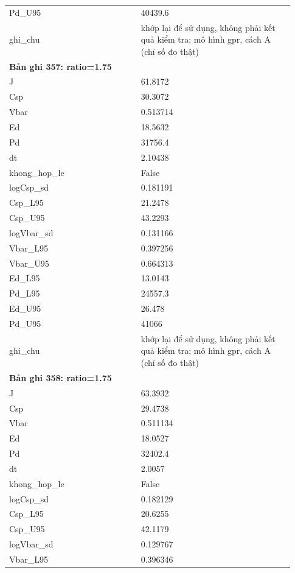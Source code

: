 \begin{longtable}{p{0.43\linewidth}p{0.50\linewidth}}
Pd\_\allowbreak U95 & 40439.6 \\
ghi\_\allowbreak chu & khớp lại để sử dụng, không phải kết quả kiểm tra; mô hình gpr, cách A (chỉ số đo thật) \\
\midrule
\multicolumn{2}{p{0.95\linewidth}}{\textbf{Bản ghi 357: ratio=1.75}} \\
J & 61.8172 \\
Csp & 30.3072 \\
Vbar & 0.513714 \\
Ed & 18.5632 \\
Pd & 31756.4 \\
dt & 2.10438 \\
khong\_\allowbreak hop\_\allowbreak le & False \\
logCsp\_\allowbreak sd & 0.181191 \\
Csp\_\allowbreak L95 & 21.2478 \\
Csp\_\allowbreak U95 & 43.2293 \\
logVbar\_\allowbreak sd & 0.131166 \\
Vbar\_\allowbreak L95 & 0.397256 \\
Vbar\_\allowbreak U95 & 0.664313 \\
Ed\_\allowbreak L95 & 13.0143 \\
Pd\_\allowbreak L95 & 24557.3 \\
Ed\_\allowbreak U95 & 26.478 \\
Pd\_\allowbreak U95 & 41066 \\
ghi\_\allowbreak chu & khớp lại để sử dụng, không phải kết quả kiểm tra; mô hình gpr, cách A (chỉ số đo thật) \\
\midrule
\multicolumn{2}{p{0.95\linewidth}}{\textbf{Bản ghi 358: ratio=1.75}} \\
J & 63.3932 \\
Csp & 29.4738 \\
Vbar & 0.511134 \\
Ed & 18.0527 \\
Pd & 32402.4 \\
dt & 2.0057 \\
khong\_\allowbreak hop\_\allowbreak le & False \\
logCsp\_\allowbreak sd & 0.182129 \\
Csp\_\allowbreak L95 & 20.6255 \\
Csp\_\allowbreak U95 & 42.1179 \\
logVbar\_\allowbreak sd & 0.129767 \\
Vbar\_\allowbreak L95 & 0.396346 \\

\end{longtable}
